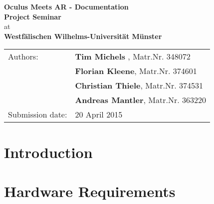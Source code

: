 



	\begin{center}
		\vspace*{54mm}
		{
			\renewcommand{\baselinestretch}{0.9}\normalsize
			\Large
			\textbf{Oculus Meets AR - Documentation}\\
		}
		\vspace*{15.5mm}
		{
			\large
			\textbf{Project Seminar}\\
		}
		\vspace*{10mm}
		{
			at\\
			\textbf{Westfälischen Wilhelms-Universität Münster}\\
		}
		\vspace*{100mm}
		\begin{tabular*}{137mm}{ll}
			Authors: 		& \textbf{Tim Michels }, Matr.Nr. 348072\\
						& \textbf{Florian Kleene}, Matr.Nr. 374601\\
						& \textbf{Christian Thiele}, Matr.Nr. 374531\\
						& \textbf{Andreas Mantler}, Matr.Nr. 363220\\
			Submission date: 	& 20 April 2015
		\end{tabular*}
	\end{center}
	\newpage
	
	\thispagestyle{empty}\quad\newpage
	
	\thispagestyle{empty}
	\tableofcontents
	\vfill
	\newpage

	\thispagestyle{empty}\quad\newpage
	
	\setcounter{page}{1}
	\pagestyle{scrheadings}
	\setfootsepline{0pt} 
	\ihead[\chaptername\ \thechapter: \leftmark]{\chaptername\ \thechapter: \leftmark}
	\cfoot[\vspace*{9mm}\pagemark]{\vspace*{9mm}\pagemark}
	\renewcommand{\baselinestretch}{1.3}\normalsize

	\chapter{Introduction}
	\label{sec:introduction}
		

	\chapter{Hardware Requirements}
	\label{sec:hardware_requirements}
	
	
